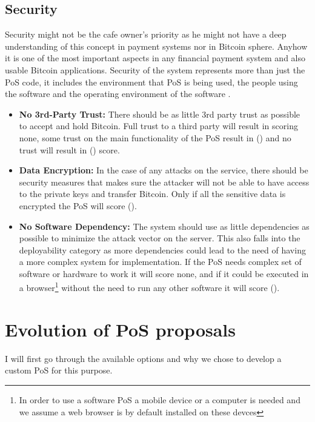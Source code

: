 \subsection{Security} Security might not be the cafe owner's priority as he might not have a deep understanding of this concept in payment systems nor in Bitcoin sphere. Anyhow it is one of the most important aspects in any financial payment system and also usable Bitcoin applications. Security of the system represents more than just the PoS code, it includes the environment that PoS is being used, the people using the software and the operating environment of the software \cite{securityreq}.
\begin{itemize}

\item \textbf{No 3rd-Party Trust: }There should be as little 3rd party trust as possible to accept and hold Bitcoin. Full trust to a third party will result in scoring none, some trust on the main functionality of the PoS result in (\prt) and no trust will result in (\full)  score.

\item \textbf{Data Encryption: }In the case of any attacks on the service, there should be security measures that makes sure the attacker will not be able to have access to the private keys and transfer Bitcoin. Only if all the sensitive data is encrypted the PoS will score (\full).

\item \textbf{No Software Dependency: }The system should use as little dependencies as possible to minimize the attack vector on the server. This also falls into the deployability category as more dependencies could lead to the need of having a more complex system for implementation. If the PoS needs complex set of software or hardware to work it will score none, and if it could be executed in a browser\footnote{In order to use a software PoS a mobile device or a computer is needed and we assume a web browser is by default installed on these devces} without the need to run any other software it will score (\full).

\end{itemize}

\section{Evolution of PoS proposals}
I will first go through the available options and why we chose to develop a custom PoS for this purpose.

